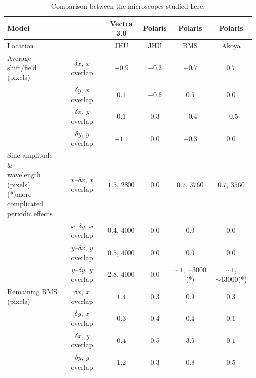 \documentclass{article}
\begin{document}
\begin{table}[ht]
	\centering
	\begin{tabular}{|l|c|c|c|c|c|}
	\hline
	\multicolumn{2}{|l|}{Model} & Vectra 3.0 & Polaris & Polaris & Polaris \\\hline
	\multicolumn{2}{|l|}{Location} & JHU & JHU & BMS & Akoya \\\hline
	\multirowcell{3}[0pt][l]{Average shift/field \\ (pixels)}
	& $\delta x$, $x$ overlap & $-0.9$ & $-0.3$ & $-0.7$ & $0.7$ \\\cline{2-6}
	& $\delta y$, $x$ overlap & $0.1$ & $-0.5$ & $0.5$ & $0.0$ \\\cline{2-6}
	& $\delta x$, $y$ overlap & $0.1$ & $0.3$ & $-0.4$ & $-0.5$ \\\cline{2-6}
	& $\delta y$, $y$ overlap & $-1.1$ & $0.0$ & $-0.3$ & $0.0$ \\\hline
	\multirowcell{4}[0pt][l]{Sine amplitude \& \\wavelength (pixels)\\ (*)more complicated\\periodic effects}
	& $x$--$\delta x$, $x$ overlap & $1.5$, $2800$ & $0.0$ & $0.7$, $3760$ & $0.7$, $3560$ \\\cline{2-6}
	& $x$--$\delta y$, $x$ overlap & $0.4$, $4000$ & $0.0$ & $0.0$ & $0.0$ \\\cline{2-6}
	& $y$--$\delta x$, $y$ overlap & $0.5$, $4000$ & $0.0$ & $0.0$ & $0.0$ \\\cline{2-6}
	& $y$--$\delta y$, $y$ overlap & $2.8$, $4000$ & $0.0$ & $\sim1$, $\sim3000$(*) & $\sim1$, $\sim13000$(*) \\\hline
	\multirowcell{4}[0pt][l]{Remaining RMS\\(pixels)}
	& $\delta x$, $x$ overlap & $1.4$ & $0.3$ & $0.9$ & $0.3$ \\\cline{2-6}
	& $\delta y$, $x$ overlap & $0.3$ & $0.4$ & $0.4$ & $0.1$ \\\cline{2-6}
	& $\delta x$, $y$ overlap & $0.4$ & $0.5$ & $3.6$ & $0.1$ \\\cline{2-6}
	& $\delta y$, $y$ overlap & $1.2$ & $0.3$ & $0.8$ & $0.5$ \\\hline
	\end{tabular}
	\caption{Comparison between the microscopes studied here.}
	\label{table:microscopes}
\end{table}
\end{document}
